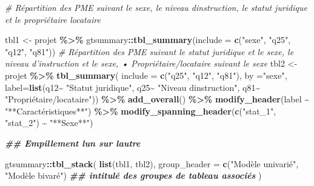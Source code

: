 \documentclass[
]{article}
\newenvironment{Shaded}{\begin{snugshade}}{\end{snugshade}}
\newcommand{\AttributeTok}[1]{\textcolor[rgb]{0.13,0.29,0.53}{#1}}
\newcommand{\CommentTok}[1]{\textcolor[rgb]{0.56,0.35,0.01}{\textit{#1}}}
\newcommand{\DocumentationTok}[1]{\textcolor[rgb]{0.56,0.35,0.01}{\textbf{\textit{#1}}}}
\newcommand{\FunctionTok}[1]{\textcolor[rgb]{0.13,0.29,0.53}{\textbf{#1}}}
\newcommand{\NormalTok}[1]{#1}
\newcommand{\OtherTok}[1]{\textcolor[rgb]{0.56,0.35,0.01}{#1}}
\newcommand{\SpecialCharTok}[1]{\textcolor[rgb]{0.81,0.36,0.00}{\textbf{#1}}}
\newcommand{\StringTok}[1]{\textcolor[rgb]{0.31,0.60,0.02}{#1}}
\begin{document}
\begin{Shaded}
\begin{Highlighting}[]
\CommentTok{\# Répartition des PME suivant le sexe, le niveau d\textquotesingle{}instruction, le statut juridique et le propriétaire locataire}

\NormalTok{tbl1 }\OtherTok{\textless{}{-}}\NormalTok{ projet }\SpecialCharTok{\%\textgreater{}\%}\NormalTok{ gtsummary}\SpecialCharTok{::}\FunctionTok{tbl\_summary}\NormalTok{(}\AttributeTok{include =} \FunctionTok{c}\NormalTok{(}\StringTok{"sexe"}\NormalTok{, }\StringTok{"q25"}\NormalTok{, }\StringTok{"q12"}\NormalTok{, }\StringTok{"q81"}\NormalTok{))}
\CommentTok{\# Répartition des PME suivant le statut juridique et le sexe,   le niveau d’instruction et le sexe, •   Propriétaire/locataire suivant le sexe}
\NormalTok{tbl2 }\OtherTok{\textless{}{-}}\NormalTok{ projet }\SpecialCharTok{\%\textgreater{}\%} \FunctionTok{tbl\_summary}\NormalTok{(}
  \AttributeTok{include =} \FunctionTok{c}\NormalTok{(}\StringTok{"q25"}\NormalTok{, }\StringTok{"q12"}\NormalTok{, }\StringTok{"q81"}\NormalTok{), }
  \AttributeTok{by =}\StringTok{"sexe"}\NormalTok{, }\AttributeTok{label=}\FunctionTok{list}\NormalTok{(q12}\SpecialCharTok{\textasciitilde{}} \StringTok{"Statut juridique"}\NormalTok{, }
\NormalTok{                         q25}\SpecialCharTok{\textasciitilde{}} \StringTok{"Niveau d\textquotesingle{}instruction"}\NormalTok{, }
\NormalTok{                         q81}\SpecialCharTok{\textasciitilde{}} \StringTok{"Propriétaire/locataire"}\NormalTok{)) }\SpecialCharTok{\%\textgreater{}\%} 
  \FunctionTok{add\_overall}\NormalTok{() }\SpecialCharTok{\%\textgreater{}\%} 
  \FunctionTok{modify\_header}\NormalTok{(label }\SpecialCharTok{\textasciitilde{}} \StringTok{"**Caractéristiques**"}\NormalTok{) }\SpecialCharTok{\%\textgreater{}\%}
  \FunctionTok{modify\_spanning\_header}\NormalTok{(}\FunctionTok{c}\NormalTok{(}\StringTok{"stat\_1"}\NormalTok{, }\StringTok{"stat\_2"}\NormalTok{) }\SpecialCharTok{\textasciitilde{}} \StringTok{"**Sexe**"}\NormalTok{) }

\DocumentationTok{\#\# Empillement l\textquotesingle{}un sur l\textquotesingle{}autre}

\NormalTok{gtsummary}\SpecialCharTok{::}\FunctionTok{tbl\_stack}\NormalTok{(}
  \FunctionTok{list}\NormalTok{(tbl1, tbl2),}
  \AttributeTok{group\_header =} \FunctionTok{c}\NormalTok{(}\StringTok{"Modèle univarié"}\NormalTok{, }\StringTok{"Modèle bivaré"}\NormalTok{) }\DocumentationTok{\#\# intitulé des groupes de tableau associés}
\NormalTok{)}
\end{Highlighting}
\end{Shaded}
\end{document}
